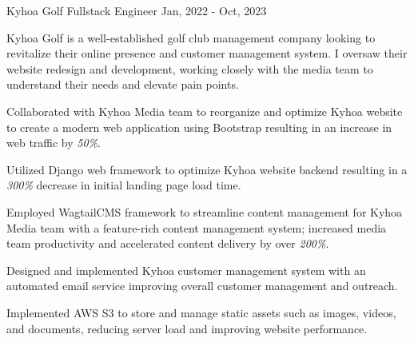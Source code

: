 \cventry
{Kyhoa Golf} %
{Fullstack Engineer} %
{ }
{Jan, 2022 - Oct, 2023} %
{
	Kyhoa Golf is a well-established golf club management company looking to revitalize their online presence and customer management system.
	I oversaw their website redesign and development, working closely with the media team to understand their needs and elevate pain points.
	\begin{cvitemsdesc}
		\item {Collaborated with Kyhoa Media team to reorganize and optimize Kyhoa website to create a modern web application using Bootstrap resulting in an increase in web traffic by \emph{50\%}.}
		\item {Utilized Django web framework to optimize Kyhoa website backend resulting in a \emph{300\%} decrease in initial landing page load time.}
		\item {Employed WagtailCMS framework to streamline content management for Kyhoa Media team with a feature-rich content management system; increased media team productivity and accelerated content delivery by over \emph{200\%}.}
		\item {Designed and implemented Kyhoa customer management system with an automated email service improving overall customer management and outreach.}
		\item {Implemented AWS S3 to store and manage static assets such as images, videos, and documents, reducing server load and improving website performance.}
	\end{cvitemsdesc}
}
